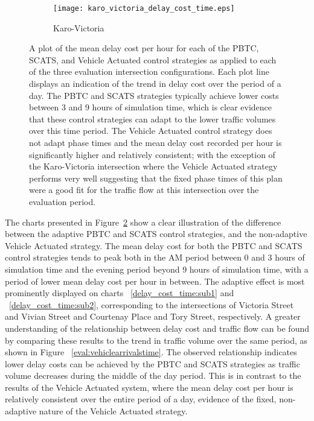 {\begin{figure}[H]
\vspace{1cm}

\begin{subfigure}{.5\textwidth}
  \centering
  \texttt{[image: karo\_victoria\_delay\_cost\_time.eps]}
  \caption{Karo-Victoria}
  \label{delay_cost_time:sub3}
\end{subfigure}%
\caption{ A plot of the mean delay cost per hour for each of the PBTC, SCATS, and Vehicle Actuated control strategies as applied to each of the three evaluation intersection configurations. Each plot line displays an indication of the trend in delay cost over the period of a day. The PBTC and SCATS strategies typically achieve lower costs between 3 and 9 hours of simulation time, which is clear evidence that these control strategies can adapt to the lower traffic volumes over this time period. The Vehicle Actuated control strategy does not adapt phase times and the mean delay cost recorded per hour is significantly higher and relatively consistent; with the exception of the Karo-Victoria intersection where the Vehicle Actuated strategy performs very well suggesting that the fixed phase times of this plan were a good fit for the traffic flow at this intersection over the evaluation period. }
\label{eval:delay_cost_time}
\end{figure}

The charts presented in Figure~\ref{eval:delay_cost_time} show a clear illustration of the difference between the adaptive PBTC and SCATS control strategies, and the non-adaptive Vehicle Actuated strategy. The mean delay cost for both the PBTC and SCATS control strategies tends to peak both in the AM period between 0 and 3 hours of simulation time and the evening period beyond 9 hours of simulation time, with a period of lower mean delay cost per hour in between. The adaptive effect is most prominently displayed on charts ~\ref{delay_cost_time:sub1} and ~\ref{delay_cost_time:sub2}, corresponding to the intersections of Victoria Street and Vivian Street and Courtenay Place and Tory Street, respectively. A greater understanding of the relationship between delay cost and traffic flow can be found by comparing these results to the trend in traffic volume over the same period, as shown in Figure ~\ref{eval:vehiclearrivalstime}. The observed relationship indicates lower delay costs can be achieved by the PBTC and SCATS strategies as traffic volume decreases during the middle of the day period. This is in contrast to the results of the Vehicle Actuated system, where the mean delay cost per hour is relatively consistent over the entire period of a day, evidence of the fixed, non-adaptive nature of the Vehicle Actuated strategy.

}

